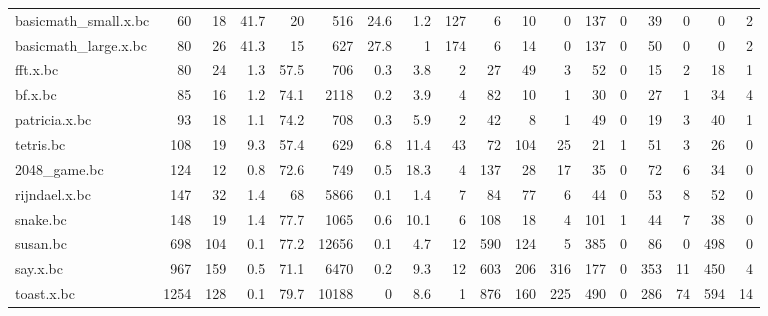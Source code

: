 \begin{tabular}{lrrrrrrrrrrrrrrrrr}
 basicmath\_small.x.bc &       60 &   18 &   41.7 &     20   &     516 &   24.6 &      1.2 &   127 &       6 &   10 &     0 &   137 &     0 &    39 &      0 &         0 &       2 \\
 basicmath\_large.x.bc &       80 &   26 &   41.3 &     15   &     627 &   27.8 &      1   &   174 &       6 &   14 &     0 &   137 &     0 &    50 &      0 &         0 &       2 \\
 fft.x.bc             &       80 &   24 &    1.3 &     57.5 &     706 &    0.3 &      3.8 &     2 &      27 &   49 &     3 &    52 &     0 &    15 &      2 &        18 &       1 \\
 bf.x.bc              &       85 &   16 &    1.2 &     74.1 &    2118 &    0.2 &      3.9 &     4 &      82 &   10 &     1 &    30 &     0 &    27 &      1 &        34 &       4 \\
 patricia.x.bc        &       93 &   18 &    1.1 &     74.2 &     708 &    0.3 &      5.9 &     2 &      42 &    8 &     1 &    49 &     0 &    19 &      3 &        40 &       1 \\
 tetris.bc            &      108 &   19 &    9.3 &     57.4 &     629 &    6.8 &     11.4 &    43 &      72 &  104 &    25 &    21 &     1 &    51 &      3 &        26 &       0 \\
 2048\_game.bc         &      124 &   12 &    0.8 &     72.6 &     749 &    0.5 &     18.3 &     4 &     137 &   28 &    17 &    35 &     0 &    72 &      6 &        34 &       0 \\
 rijndael.x.bc        &      147 &   32 &    1.4 &     68   &    5866 &    0.1 &      1.4 &     7 &      84 &   77 &     6 &    44 &     0 &    53 &      8 &        52 &       0 \\
 snake.bc             &      148 &   19 &    1.4 &     77.7 &    1065 &    0.6 &     10.1 &     6 &     108 &   18 &     4 &   101 &     1 &    44 &      7 &        38 &       0 \\
 susan.bc             &      698 &  104 &    0.1 &     77.2 &   12656 &    0.1 &      4.7 &    12 &     590 &  124 &     5 &   385 &     0 &    86 &      0 &       498 &       0 \\
 say.x.bc             &      967 &  159 &    0.5 &     71.1 &    6470 &    0.2 &      9.3 &    12 &     603 &  206 &   316 &   177 &     0 &   353 &     11 &       450 &       4 \\
 toast.x.bc           &     1254 &  128 &    0.1 &     79.7 &   10188 &    0   &      8.6 &     1 &     876 &  160 &   225 &   490 &     0 &   286 &     74 &       594 &      14 \\

\end{tabular}
